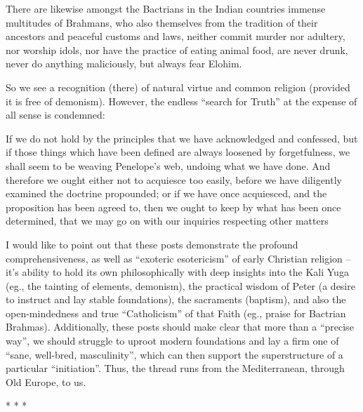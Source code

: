 \begin{quotex}
There are likewise amongst the Bactrians in the Indian countries immense multitudes of Brahmans, who also themselves from the tradition of their ancestors and peaceful customs and laws, neither commit murder nor adultery, nor worship idols, nor have the practice of eating animal food, are never drunk, never do anything maliciously, but always fear Elohim.
\end{quotex}


So we see a recognition (there) of natural virtue and common religion (provided it is free of demonism). However, the endless ``search for Truth'' at the expense of all sense is condemned:

\begin{quotex}
If we do not hold by the principles that we have acknowledged and confessed, but if those things which have been defined are always loosened by forgetfulness, we shall seem to be weaving Penelope's web, undoing what we have done. And therefore we ought either not to acquiesce too easily, before we have diligently examined the doctrine propounded; or if we have once acquiesced, and the proposition has been agreed to, then we ought to keep by what has been once determined, that we may go on with our inquiries respecting other matters
\end{quotex}


I would like to point out that these posts demonstrate the profound comprehensiveness, as well as ``exoteric esotericism'' of early Christian religion -- it's ability to hold its own philosophically with deep insights into the Kali Yuga (eg., the tainting of elements, demonism), the practical wisdom of Peter (a desire to instruct and lay stable foundations), the sacraments (baptism), and also the open-mindedness and true ``Catholicism'' of that Faith (eg., praise for Bactrian Brahmas). Additionally, these posts should make clear that more than a ``precise way'', we should struggle to uproot modern foundations and lay a firm one of ``sane, well-bred, masculinity'', which can then support the superstructure of a particular ``initiation''. Thus, the thread runs from the Mediterranean, through Old Europe, to us.



\begin{center}* * *\end{center}


